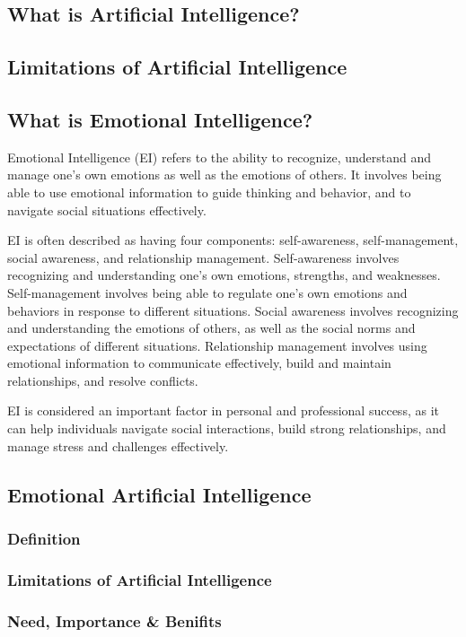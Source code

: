\subsection{What is Artificial Intelligence?}
\subsection{Limitations of Artificial Intelligence}
\subsection{What is Emotional Intelligence?}
Emotional Intelligence (EI) refers to the ability to recognize, understand and manage one's own emotions as well as the emotions of others. It involves being able to use emotional information to guide thinking and behavior, and to navigate social situations effectively.

EI is often described as having four components: self-awareness, self-management, social awareness, and relationship management. Self-awareness involves recognizing and understanding one's own emotions, strengths, and weaknesses. Self-management involves being able to regulate one's own emotions and behaviors in response to different situations. Social awareness involves recognizing and understanding the emotions of others, as well as the social norms and expectations of different situations. Relationship management involves using emotional information to communicate effectively, build and maintain relationships, and resolve conflicts.

EI is considered an important factor in personal and professional success, as it can help individuals navigate social interactions, build strong relationships, and manage stress and challenges effectively.
\subsection{Emotional Artificial Intelligence}
\subsubsection{Definition}
\subsubsection{Limitations of Artificial Intelligence}
\subsubsection{Need, Importance \& Benifits}
